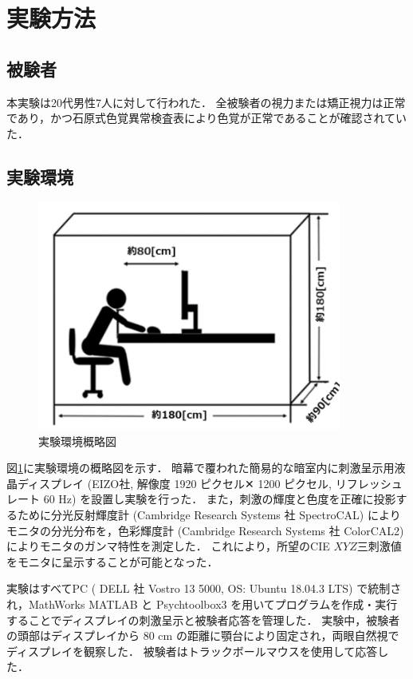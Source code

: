     \section{実験方法}
        \subsection{被験者}
            本実験は20代男性7人に対して行われた．
            全被験者の視力または矯正視力は正常であり，かつ石原式色覚異常検査表により色覚が正常であることが確認されていた．

        \subsection{実験環境}

            \begin{figure}[h]
                \centering
                \includegraphics[width=10.0cm]{./img/darkroom_p.png}
                \caption{実験環境概略図}
                \label{darkroom}
            \end{figure}

            図\ref{darkroom}に実験環境の概略図を示す．
            暗幕で覆われた簡易的な暗室内に刺激呈示用液晶ディスプレイ (EIZO社, 解像度 1920 ピクセル✕ 1200 ピクセル, リフレッシュレート 60 Hz) を設置し実験を行った．
            また，刺激の輝度と色度を正確に投影するために分光反射輝度計 (Cambridge Research Systems 社 SpectroCAL) によりモニタの分光分布を，色彩輝度計 (Cambridge Research Systems 社 ColorCAL2) によりモニタのガンマ特性を測定した．
            これにより，所望のCIE $XYZ$三刺激値をモニタに呈示することが可能となった．
            
            実験はすべてPC ( DELL 社 Vostro 13 5000, OS: Ubuntu 18.04.3 LTS) で統制され，MathWorks MATLAB と Psychtoolbox3\cite{Psychtoolbox} を用いてプログラムを作成・実行することでディスプレイの刺激呈示と被験者応答を管理した．
            実験中，被験者の頭部はディスプレイから 80 cm の距離に顎台により固定され，両眼自然視でディスプレイを観察した．
            被験者はトラックボールマウスを使用して応答した．

